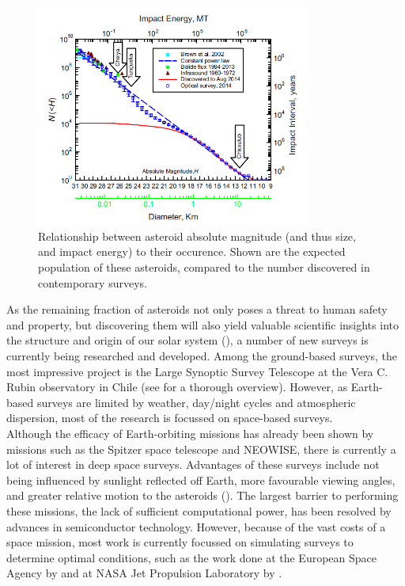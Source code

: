 \documentclass[12pt, english, NoHyper]{AE4010-template}
\begin{document}
\begin{figure}[thb]
 \centering
 \includegraphics[width=0.8\textwidth]{figures/populationdifference.png}
 \caption{Relationship between asteroid absolute magnitude (and thus size, and impact energy) to their occurence. Shown are the expected population of these asteroids, compared to the number discovered in contemporary surveys.}
 \label{fig:populationdifference}
\end{figure}

As the remaining fraction of asteroids not only poses a threat to human safety and property, but discovering them will also yield valuable scientific insights into the structure and origin of our solar system (\cite{Populations}), a number of new surveys is currently being researched and developed. Among the ground-based surveys, the most impressive project is the Large Synoptic Survey Telescope at the Vera C. Rubin observatory in Chile (see \cite{LSST} for a thorough overview). However, as Earth-based surveys are limited by weather, day/night cycles and atmospheric dispersion, most of the research is focussed on space-based surveys. \\

Although the efficacy of Earth-orbiting missions has already been shown by missions such as the Spitzer space telescope and NEOWISE, there is currently a lot of interest in deep space surveys. Advantages of these surveys include not being influenced by sunlight reflected off Earth, more favourable viewing angles, and greater relative motion to the asteroids (\cite{NEOSDT1}). The largest barrier to performing these missions, the lack of sufficient computational power, has been resolved by advances in semiconductor technology. However, because of the vast costs of a space mission, most work is currently focussed on simulating surveys to determine optimal conditions, such as the work done at the European Space Agency by \cite{Flyeye} and at NASA Jet Propulsion Laboratory by \cite{NEOSDT2}. \\
\end{document}
